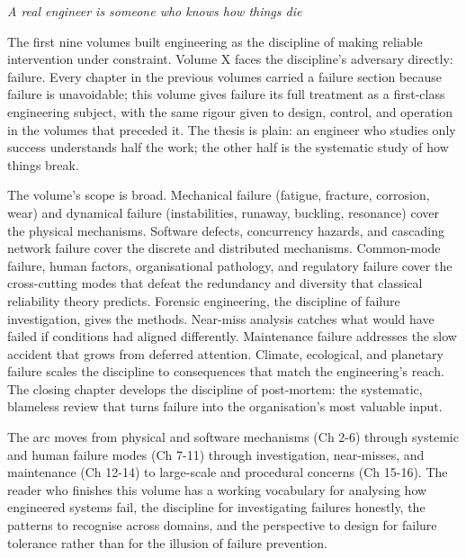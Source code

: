 
\vspace*{1.5cm}
\begin{center}
\itshape\large
A real engineer is someone who knows how things die
\end{center}
\vspace{0.5cm}

\noindent
The first nine volumes built engineering as the discipline of making reliable intervention under constraint. Volume X faces the discipline's adversary directly: failure. Every chapter in the previous volumes carried a failure section because failure is unavoidable; this volume gives failure its full treatment as a first-class engineering subject, with the same rigour given to design, control, and operation in the volumes that preceded it. The thesis is plain: an engineer who studies only success understands half the work; the other half is the systematic study of how things break.

The volume's scope is broad. Mechanical failure (fatigue, fracture, corrosion, wear) and dynamical failure (instabilities, runaway, buckling, resonance) cover the physical mechanisms. Software defects, concurrency hazards, and cascading network failure cover the discrete and distributed mechanisms. Common-mode failure, human factors, organisational pathology, and regulatory failure cover the cross-cutting modes that defeat the redundancy and diversity that classical reliability theory predicts. Forensic engineering, the discipline of failure investigation, gives the methods. Near-miss analysis catches what would have failed if conditions had aligned differently. Maintenance failure addresses the slow accident that grows from deferred attention. Climate, ecological, and planetary failure scales the discipline to consequences that match the engineering's reach. The closing chapter develops the discipline of post-mortem: the systematic, blameless review that turns failure into the organisation's most valuable input.

The arc moves from physical and software mechanisms (Ch 2-6) through systemic and human failure modes (Ch 7-11) through investigation, near-misses, and maintenance (Ch 12-14) to large-scale and procedural concerns (Ch 15-16). The reader who finishes this volume has a working vocabulary for analysing how engineered systems fail, the discipline for investigating failures honestly, the patterns to recognise across domains, and the perspective to design for failure tolerance rather than for the illusion of failure prevention.

